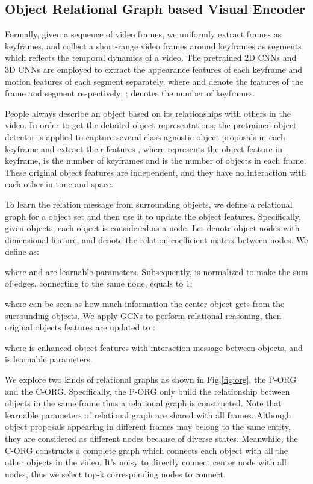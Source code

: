 \documentclass[10pt,twocolumn,letterpaper]{article}
\begin{document}
\subsection{Object Relational Graph based Visual Encoder}

Formally, given a sequence of video frames, we uniformly extract  frames as keyframes, and collect a short-range video frames around keyframes as segments which reflects the temporal dynamics of a video.
The pretrained 2D CNNs and 3D CNNs are employed to extract the appearance features  of each keyframe and motion features  of each segment separately, where  and  denote the features of the  frame and segment respectively; ;  denotes the number of keyframes.

People always describe an object based on its relationships with others in the video. In order to get the detailed object representations, the pretrained object detector is applied to capture several class-agnostic object proposals in each keyframe and extract their features , where  represents the  object feature in  keyframe,  is the number of keyframes and  is the number of objects in each frame. These original object features are independent, and they have no interaction with each other in time and space.

To learn the relation message from surrounding objects, we define a relational graph for a object set and then use it to update the object features. Specifically, given  objects, each object is considered as a node. Let  denote  object nodes with  dimensional feature, and  denote the relation coefficient matrix between  nodes. We define  as: 


where  and  are learnable parameters. Subsequently,  is normalized to make the sum of edges, connecting to the same node, equals to 1:

where  can be seen as how much information the center object gets from the surrounding objects. We apply GCNs to perform relational reasoning, then original objects features  are updated to :

where  is enhanced object features with interaction message between objects, and  is learnable parameters.

We explore two kinds of relational graphs as shown in Fig.\ref{fig:org}, the P-ORG and the C-ORG. Specifically, the P-ORG only build the relationship between  objects in the same frame thus a  relational graph is constructed. Note that learnable parameters of relational graph are shared with all  frames. Although object proposals appearing in different frames may belong to the same entity, they are considered as different nodes because of diverse states. Meanwhile, the C-ORG constructs a complete graph  which connects each object with all the other  objects in the video. It's noisy to directly connect center node with all  nodes, thus we select top-k corresponding nodes to connect.
\end{document}
